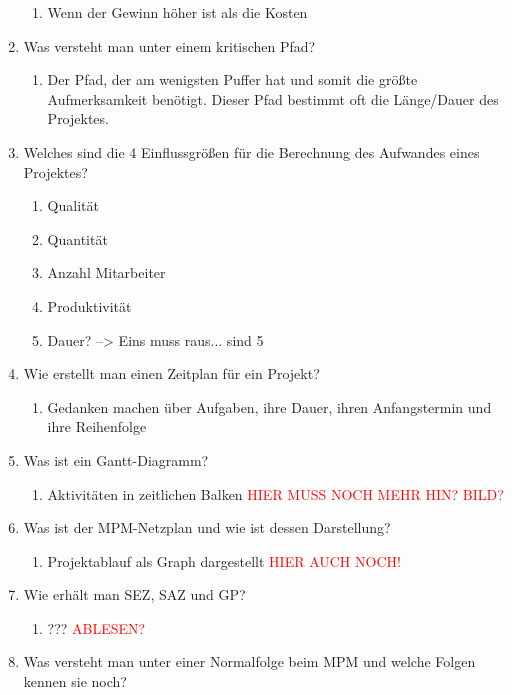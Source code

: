 \documentclass[12pt,a4paper]{article}
\begin{document}
\begin{enumerate}
	\begin{enumerate}
		\item Wenn der Gewinn höher ist als die Kosten
	\end{enumerate}
	\item Was versteht man unter einem kritischen Pfad?
	\begin{enumerate}
		\item Der Pfad, der am wenigsten Puffer hat und somit die größte Aufmerksamkeit benötigt. Dieser Pfad bestimmt oft die Länge/Dauer des Projektes.
	\end{enumerate}
	\item Welches sind die 4 Einflussgrößen für die Berechnung des Aufwandes eines Projektes?
	\begin{enumerate}
		\item Qualität
		\item Quantität
		\item Anzahl Mitarbeiter
		\item Produktivität
		\item Dauer? --> Eins muss raus... sind 5
	\end{enumerate}
	\item Wie erstellt man einen Zeitplan für ein Projekt?
	\begin{enumerate}
		\item Gedanken machen über Aufgaben, ihre Dauer, ihren Anfangstermin und ihre Reihenfolge
	\end{enumerate}
	\item Was ist ein Gantt-Diagramm?
	\begin{enumerate}
		\item Aktivitäten in zeitlichen Balken \textcolor{red}{HIER MUSS NOCH MEHR HIN? BILD?}
	\end{enumerate}
	\item Was ist der MPM-Netzplan und wie ist dessen Darstellung?
	\begin{enumerate}
		\item Projektablauf als Graph dargestellt \textcolor{red}{HIER AUCH NOCH!}
	\end{enumerate}
	\item Wie erhält man SEZ, SAZ und GP?
	\begin{enumerate}
		\item ??? \textcolor{red}{ABLESEN?}
	\end{enumerate}
	\item Was versteht man unter einer Normalfolge beim MPM und welche Folgen kennen sie noch?
	\begin{enumerate}

\end{enumerate}
\end{enumerate}
\end{document}
